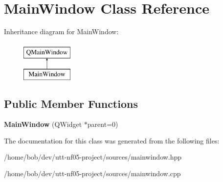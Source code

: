 \hypertarget{classMainWindow}{\section{Main\+Window Class Reference}
\label{classMainWindow}
}
Inheritance diagram for Main\+Window\+:\begin{figure}[H]
\begin{center}
\leavevmode
\includegraphics[height=2.000000cm]{classMainWindow}
\end{center}
\end{figure}
\subsection*{Public Member Functions}
\begin{DoxyCompactItemize}
\item 
\hypertarget{classMainWindow_a8b244be8b7b7db1b08de2a2acb9409db}{{\bfseries Main\+Window} (Q\+Widget $\ast$parent=0)}\label{classMainWindow_a8b244be8b7b7db1b08de2a2acb9409db}

\end{DoxyCompactItemize}


The documentation for this class was generated from the following files\+:\begin{DoxyCompactItemize}
\item 
/home/bob/dev/utt-\/nf05-\/project/sources/mainwindow.\+hpp\item 
/home/bob/dev/utt-\/nf05-\/project/sources/mainwindow.\+cpp\end{DoxyCompactItemize}
